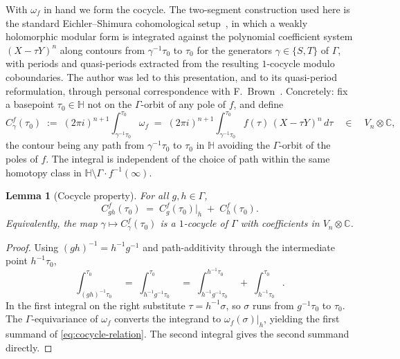\documentclass[11pt]{article}
\newtheorem{lemma}[theorem]{Lemma}
\numberwithin{equation}{section}  %
\newcommand{\HH}{\mathbb{H}}
\newcommand{\CC}{\mathbb{C}}
\begin{document}
With $\omega_f$ in hand we form the cocycle.
The two-segment construction used here is the
standard Eichler--Shimura cohomological setup~\cite{KZ1984}, in which a
weakly holomorphic modular form is integrated against the polynomial
coefficient system $(X - \tau Y)^n$ along contours from $\gamma^{-1}\tau_0$
to $\tau_0$ for the generators $\gamma \in \{S, T\}$ of $\Gamma$, with
periods and quasi-periods extracted from the resulting $1$-cocycle
modulo coboundaries.  The author was led to this presentation, and to its
quasi-period reformulation, through personal correspondence with
F.\ Brown~\cite{Brown2019Email}.  Concretely:
fix a basepoint $\tau_0 \in \HH$ not on the $\Gamma$-orbit of any pole
of $f$, and define
\begin{equation}\label{eq:cocycle-def}
  C^f_\gamma(\tau_0)
  \;:=\; (2\pi i)^{n+1}\!\int_{\gamma^{-1}\tau_0}^{\tau_0}\!\omega_f
  \;=\; (2\pi i)^{n+1}\!\int_{\gamma^{-1}\tau_0}^{\tau_0}\!
  f(\tau)\,(X - \tau Y)^n\,d\tau
  \quad \in \quad V_n \otimes \CC,
\end{equation}
the contour being any path from $\gamma^{-1}\tau_0$ to $\tau_0$ in
$\HH$ avoiding the $\Gamma$-orbit of the poles of $f$.  The integral
is independent of the choice of path within the same homotopy class in
$\HH \setminus \Gamma\!\cdot\! f^{-1}(\infty)$.

\begin{lemma}[Cocycle property]\label{lem:cocycle}
For all $g, h \in \Gamma$,
\begin{equation}\label{eq:cocycle-relation}
  C^f_{gh}(\tau_0) \;=\; C^f_g(\tau_0)|_h \;+\; C^f_h(\tau_0).
\end{equation}
Equivalently, the map $\gamma \mapsto C^f_\gamma(\tau_0)$ is a
$1$-cocycle of $\Gamma$ with coefficients in $V_n \otimes \CC$.
\end{lemma}
\begin{proof}
Using $(gh)^{-1} = h^{-1}g^{-1}$ and path-additivity through the
intermediate point $h^{-1}\tau_0$,
\begin{equation}
  \int_{(gh)^{-1}\tau_0}^{\tau_0}
  \;=\; \int_{h^{-1}g^{-1}\tau_0}^{\tau_0}
  \;=\; \int_{h^{-1}g^{-1}\tau_0}^{h^{-1}\tau_0}
  \;+\; \int_{h^{-1}\tau_0}^{\tau_0}.
\end{equation}
In the first integral on the right substitute $\tau = h^{-1}\sigma$, so $\sigma$
runs from $g^{-1}\tau_0$ to $\tau_0$.  The $\Gamma$-equivariance of
$\omega_f$ converts the integrand to $\omega_f(\sigma)|_h$, yielding
the first summand of \eqref{eq:cocycle-relation}.  The second integral
gives the second summand directly.
\end{proof}
\end{document}
